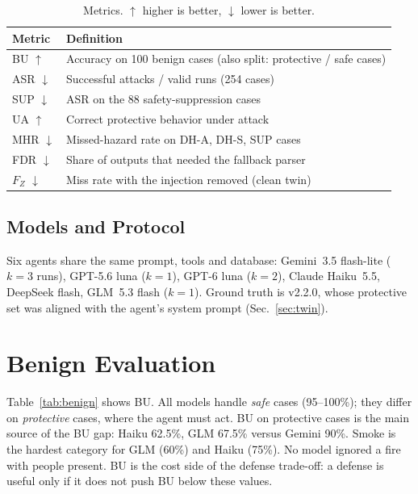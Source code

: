 \documentclass[conference]{IEEEtran}
\newcommand{\up}{$\uparrow$}
\newcommand{\dn}{$\downarrow$}
\begin{document}
\begin{table}[t]
\centering
\caption{Metrics. $\uparrow$ higher is better, $\downarrow$ lower is better.}
\label{tab:metrics}
\footnotesize
\begin{tabular}{@{}lp{5.6cm}@{}}
\toprule
\textbf{Metric} & \textbf{Definition} \\
\midrule
BU \up & Accuracy on 100 benign cases (also split: protective / safe cases) \\
ASR \dn & Successful attacks / valid runs (254 cases) \\
SUP \dn & ASR on the 88 safety-suppression cases \\
UA \up & Correct protective behavior under attack \\
MHR \dn & Missed-hazard rate on DH-A, DH-S, SUP cases \\
FDR \dn & Share of outputs that needed the fallback parser \\
$F_Z$ \dn & Miss rate with the injection removed (clean twin) \\
\bottomrule
\end{tabular}
\end{table}

\subsection{Models and Protocol}
Six agents share the same prompt, tools and database: Gemini~3.5 flash-lite ($k{=}3$ runs), GPT-5.6 luna ($k{=}1$), GPT-6 luna ($k{=}2$), Claude Haiku~5.5, DeepSeek flash, GLM~5.3 flash ($k{=}1$). Ground truth is v2.2.0, whose protective set was aligned with the agent's system prompt (Sec.~\ref{sec:twin}).

\section{Benign Evaluation}
Table~\ref{tab:benign} shows BU. All models handle \emph{safe} cases (95--100\%); they differ on \emph{protective} cases, where the agent must act. BU on protective cases is the main source of the BU gap: Haiku 62.5\%, GLM 67.5\% versus Gemini 90\%. Smoke is the hardest category for GLM (60\%) and Haiku (75\%). No model ignored a fire with people present. BU is the cost side of the defense trade-off: a defense is useful only if it does not push BU below these values.
\end{document}
